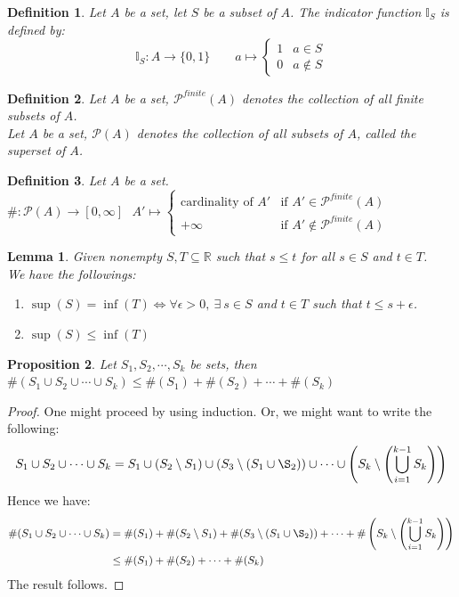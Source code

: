\documentclass[15pt]{book}
\theoremstyle{break}
\theoremstyle{break}
\newtheorem{lem}{Lemma}[thm]
\newtheorem{prop}[lem]{Proposition}
\newtheorem{defn}{Definition}[corL]
\newcommand{\R}{\mathbb{R}}
\newcommand{\Power}{\mathcal{P}}
\begin{document}
\begin{defn}
Let $A$ be a set, let $S$ be a subset of $A$. The indicator function $\mathbb{I}_S$ is defined by:
$$\mathbb{I}_S: A \to \{0,1\} \qquad a\mapsto \begin{cases} 1 & a \in S \\ 0 & a \notin S\end{cases}$$
\end{defn}

\begin{defn}
Let $A$ be a set, $\Power^{finite}(A)$ denotes the collection of all finite subsets of $A$.\\
Let $A$ be a set, $\Power(A)$ denotes the collection of all subsets of $A$, called the superset of $A$.
\end{defn}

\begin{defn}
Let $A$ be a set. $\# : \Power(A) \to [0,\infty] \ \ \ A' \mapsto \begin{cases}
\text{cardinality of }A' & \text{if }A'  \in \Power^{finite}(A)\\
+ \infty & \text{if }A'  \notin \Power^{finite}(A)
\end{cases}$
\end{defn}


\begin{lem}
Given nonempty $S,T \subseteq \R$ such that $s\leq t$ for all $s \in S$ and $t \in T$.\\
We have the followings:
\begin{enumerate}[topsep=3pt,itemsep=-1ex,partopsep=1ex,parsep=1ex]
\item $\sup(S) = \inf(T) \iff \forall \epsilon>0,\ \exists\ s \in S$ and $t \in T$ such that $t \leq s+\epsilon$.
\item $\sup(S) \leq \inf(T)$
\end{enumerate}
\end{lem}
\newpage


\begin{prop}
Let $S_1,S_2,\cdots, S_k$ be sets, then $\#(S_1\cup S_2\cup \cdots\cup S_k) \leq \#(S_1)+\#(S_2)+\cdots+\#(S_k)$
\end{prop}
\begin{proof}
One might proceed by using induction. Or, we might want to write the following:
$$S_1\cup S_2\cup \cdots \cup S_k = S_1 \cup (S_2\setminus S_1) \cup (S_3\setminus(S_1\cup\S_2))\cup \cdots \cup \left(S_k \setminus\left(\bigcup_{i=1}^{k-1} S_k\right)\right)$$
Hence we have:
\begin{align*}
\#(S_1\cup S_2\cup \cdots \cup S_k) &= \#(S_1) + \#(S_2\setminus S_1) + \#(S_3\setminus(S_1\cup\S_2))+ \cdots + \#\left(S_k \setminus\left(\bigcup_{i=1}^{k-1} S_k\right)\right) \\
&\leq \#(S_1)+\#(S_2)+\cdots+\#(S_k)
\end{align*}
The result follows.
\end{proof}
\end{document}
